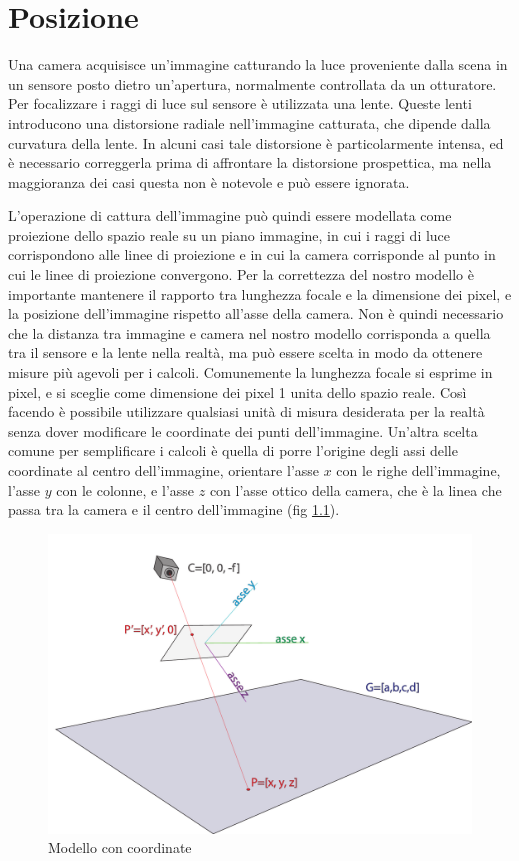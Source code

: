 \chapter{Posizione}
\label{sec:posizione}

Una camera acquisisce un'immagine catturando la luce proveniente dalla scena in un sensore posto dietro un'apertura, normalmente controllata da un otturatore.
Per focalizzare i raggi di luce sul sensore è utilizzata una lente.
Queste lenti introducono una distorsione radiale nell'immagine catturata, che dipende dalla curvatura della lente.
In alcuni casi tale distorsione è particolarmente intensa, ed è necessario correggerla prima di affrontare la distorsione prospettica, ma nella maggioranza dei casi questa non è notevole e può essere ignorata.

L'operazione di cattura dell'immagine può quindi essere modellata come proiezione dello spazio reale su un piano immagine, in cui i raggi di luce corrispondono alle linee di proiezione e in cui la camera corrisponde al punto in cui le linee di proiezione convergono.
Per la correttezza del nostro modello è importante mantenere il rapporto tra lunghezza focale e la dimensione dei pixel, e la posizione dell'immagine rispetto all'asse della camera.
Non è quindi necessario che la distanza tra immagine e camera nel nostro modello corrisponda a quella tra il sensore e la lente nella realtà, ma può essere scelta in modo da ottenere misure più agevoli per i calcoli.
Comunemente la lunghezza focale si esprime in pixel, e si sceglie come dimensione dei pixel 1 unita dello spazio reale.
Così facendo è possibile utilizzare qualsiasi unità di misura desiderata per la realtà senza dover modificare le coordinate dei punti dell'immagine.
Un'altra scelta comune per semplificare i calcoli è quella di porre l'origine degli assi delle coordinate al centro dell'immagine, orientare l'asse $x$ con le righe dell'immagine, l'asse $y$ con le colonne, e l'asse $z$ con l'asse ottico della camera, che è la linea che passa tra la camera e il centro dell'immagine (fig \ref{fig:camera coords}).

\begin{figure}
    \centering
    \includegraphics[width=\textwidth]{images/camera coords.pdf}
    \caption{Modello con coordinate}
    \label{fig:camera coords}
\end{figure}

